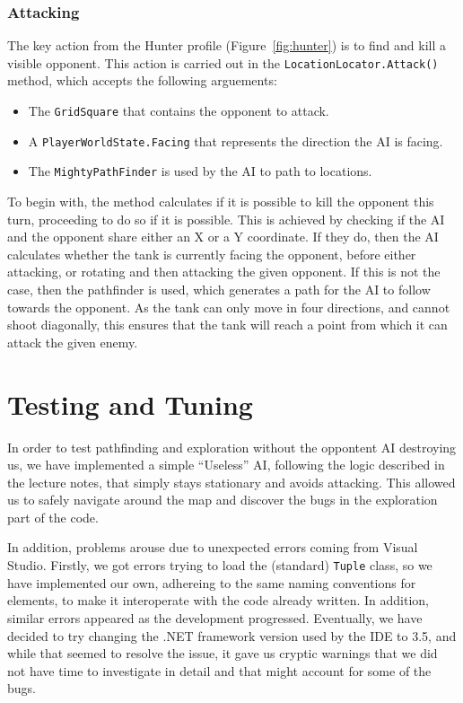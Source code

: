 \documentclass[11pt]{article}
\begin{document}
\subsubsection{Attacking}

The key action from the Hunter profile (Figure~\ref{fig:hunter}) is to find and kill a visible opponent. This action is carried out in the \verb|LocationLocator.Attack()| method, which accepts the following arguements:
\begin{itemize}
\item The \verb|GridSquare| that contains the opponent to attack.
\item A \verb|PlayerWorldState.Facing| that represents the direction the AI is facing.
\item The \verb|MightyPathFinder| is used by the AI to path to locations.
\end{itemize}

To begin with, the method calculates if it is possible to kill the opponent this turn, proceeding to do so if it is possible. This is achieved by checking if the AI and the opponent share either an X or a Y coordinate. If they do, then the AI calculates whether the tank is currently facing the opponent, before either attacking, or rotating and then attacking the given opponent. If this is not the case, then the pathfinder is used, which generates a path for the AI to follow towards the opponent. As the tank can only move in four directions, and cannot shoot diagonally, this ensures that the tank will reach a point from which it can attack the given enemy.

\section{Testing and Tuning}

In order to test pathfinding and exploration without the oppontent AI destroying us, we have implemented a simple ``Useless'' AI, following the logic described in the lecture notes, that simply stays stationary and avoids attacking. This allowed us to safely navigate around the map and discover the bugs in the exploration part of the code.

In addition, problems arouse due to unexpected errors coming from Visual Studio. Firstly, we got errors trying to load the (standard) \verb|Tuple| class, so we have implemented our own, adhereing to the same naming conventions for elements\cite{cSharpTuple}, to make it interoperate with the code already written. In addition, similar errors appeared as the development progressed. Eventually, we have decided to try changing the .NET framework version used by the IDE to 3.5, and while that seemed to resolve the issue, it gave us cryptic warnings that we did not have time to investigate in detail and that might account for some of the bugs.
\end{document}
